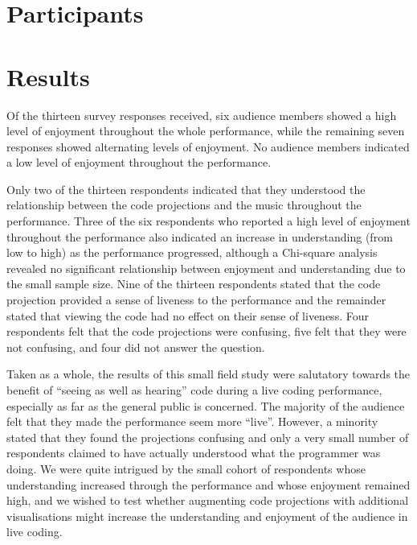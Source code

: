 \section{Participants}



\section{Results}


Of the thirteen survey responses received, six audience members showed
a high level of enjoyment throughout the whole performance, while the
remaining seven responses showed alternating levels of enjoyment. No
audience members indicated a low level of enjoyment throughout the
performance.

Only two of the thirteen respondents indicated that they understood
the relationship between the code projections and the music throughout
the performance. Three of the six respondents who reported a high
level of enjoyment throughout the performance also indicated an
increase in understanding (from low to high) as the performance
progressed, although a Chi-square analysis revealed no significant
relationship between enjoyment and understanding due to the small
sample size. Nine of the thirteen respondents stated that the code
projection provided a sense of liveness to the performance and the
remainder stated that viewing the code had no effect on their sense of
liveness. Four respondents felt that the code projections were
confusing, five felt that they were not confusing, and four did not
answer the question.

Taken as a whole, the results of this small field study were
salutatory towards the benefit of ``seeing as well as hearing'' code
during a live coding performance, especially as far as the general
public is concerned. The majority of the audience felt that they made
the performance seem more ``live''. However, a minority stated that
they found the projections confusing and only a very small number of
respondents claimed to have actually understood what the programmer
was doing. We were quite intrigued by the small cohort of respondents
whose understanding increased through the performance and whose
enjoyment remained high, and we wished to test whether augmenting code
projections with additional visualisations might increase the
understanding and enjoyment of the audience in live coding.


